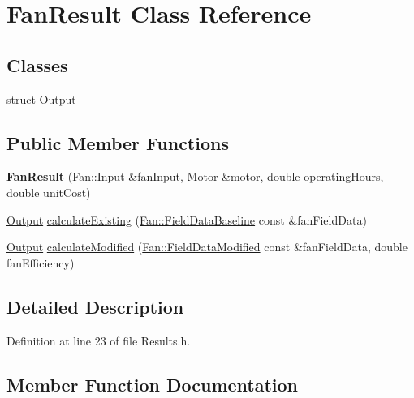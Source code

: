 \hypertarget{class_fan_result}{}\section{Fan\+Result Class Reference}
\label{class_fan_result}
\subsection*{Classes}
\begin{DoxyCompactItemize}
\item 
struct \hyperlink{struct_fan_result_1_1_output}{Output}
\end{DoxyCompactItemize}
\subsection*{Public Member Functions}
\begin{DoxyCompactItemize}
\item 
\mbox{\label{class_fan_result_a337f5f21d1d73ed5ede7d5083e2490ce}} 
{\bfseries Fan\+Result} (\hyperlink{struct_fan_1_1_input}{Fan\+::\+Input} \&fan\+Input, \hyperlink{struct_motor}{Motor} \&motor, double operating\+Hours, double unit\+Cost)
\item 
\hyperlink{struct_fan_result_1_1_output}{Output} \hyperlink{class_fan_result_ad9bd0cc8f62fcb7bb7aca7eea511a2f3}{calculate\+Existing} (\hyperlink{struct_fan_1_1_field_data_baseline}{Fan\+::\+Field\+Data\+Baseline} const \&fan\+Field\+Data)
\item 
\hyperlink{struct_fan_result_1_1_output}{Output} \hyperlink{class_fan_result_ac8b8ab301fca8ce4d37e6d4fbd44b9b9}{calculate\+Modified} (\hyperlink{struct_fan_1_1_field_data_modified}{Fan\+::\+Field\+Data\+Modified} const \&fan\+Field\+Data, double fan\+Efficiency)
\end{DoxyCompactItemize}


\subsection{Detailed Description}


Definition at line 23 of file Results.\+h.



\subsection{Member Function Documentation}
\mbox{\label{class_fan_result_ad9bd0cc8f62fcb7bb7aca7eea511a2f3}} 
